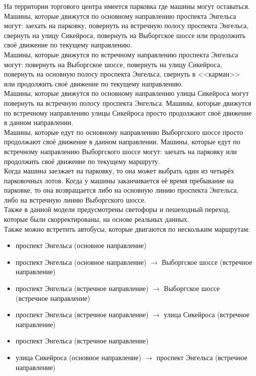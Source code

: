 \documentclass[14pt,fleqn]{extarticle}
\begin{document}
	На территории торгового центра имеется парковка где машины могут оставаться.\\
	
	Машины, которые движутся по основному направлению проспекта Энгельса могут: заехать на парковку, повернуть на встречную полосу проспекта Энгельса, свернуть на улицу Сикейроса, повернуть на Выборгское шоссе или продолжить своё движение по текущему направлению.\\
	
	Машины, которые движутся по встречному направлению проспекта Энгельса могут: повернуть на Выборгское шоссе, повернуть на улицу Сикейроса, повернуть на основную полосу проспекта Энгельса, свернуть в <<карман>> или продолжить своё движение по текущему направлению.\\
	
	Машины, которые движутся по основному направлению улицы Сикейроса могут повернуть на встречную полосу проспекта Энгельса. Машины, которые движутся по встречному направлению улицы Сикейроса просто продолжают своё движение в данном направлении.\\
	
	Машины, которые едут по основному направлению Выборгского шоссе просто продолжают своё движение в данном направлении. Машины, которые едут по встречному направлению Выборгского шоссе могут: заехать на парковку или продолжить своё движение по текущему маршруту.\\
	
	Когда машина заезжает на парковку, то она может выбрать один из четырёх парковочных лотов. Когда у машины заканчивается её время пребывание на парковке, то она возвращается либо на основную линию проспекта Энгельса, либо на встречную линию Выборгского шоссе.\\
	
	Также в данной модели предусмотрены светофоры и пешеходный переход, которые были скорректированы, на основе реальных данных.\\
	
	Также можно встретить автобусы, которые двигаются по нескольким маршрутам:
	\begin{itemize}[topsep=0pt,itemsep=-1ex,partopsep=1ex,parsep=1ex]
		\item проспект Энгельса (основное направление)
		\item проспект Энгельса (основное направление) $\rightarrow$ Выборгское шоссе (встречное направление)
		\item проспект Энгельса (встречное направление) $\rightarrow$ Выборгское шоссе (встречное направление)
		\item проспект Энгельса (встречное направление) $\rightarrow$ улица Сикейроса (встречное направление)
		\item проспект Энгельса (встречное направление)
		\item улица Сикейроса (основное направление) $\rightarrow$ проспект Энгельса (встречное направление)
	\end{itemize}
	
\end{document}
